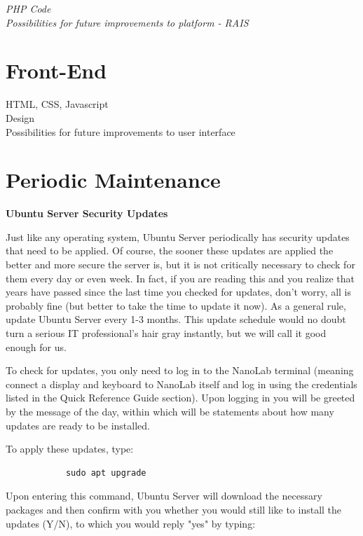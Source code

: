 \documentclass[titlepage]{article}
\begin{document}
    \noindent\textit{PHP Code}
    \\
    
    \noindent\textit{Possibilities for future improvements to platform - RAIS}
    
\section{Front-End}

    HTML, CSS, Javascript 
    \\
    
    \noindent Design
    \\
    
    \noindent Possibilities for future improvements to user interface

\section{Periodic Maintenance}

    \textbf{Ubuntu Server Security Updates}
    
        Just like any operating system, Ubuntu Server periodically has security updates that need to be applied. Of course, the sooner these updates are applied the better and more secure the server is, but it is not critically necessary to check for them every day or even week. In fact, if you are reading this and you realize that years have passed since the last time you checked for updates, don't worry, all is probably fine (but better to take the time to update it now). As a general rule, update Ubuntu Server every 1-3 months. This update schedule would no doubt turn a serious IT professional's hair gray instantly, but we will call it good enough for us.
        
        To check for updates, you only need to log in to the NanoLab terminal (meaning connect a display and keyboard to NanoLab itself and log in using the credentials listed in the Quick Reference Guide section). Upon logging in you will be greeted by the message of the day, within which will be statements about how many updates are ready to be installed.
        
        To apply these updates, type:
        
        \begin{verbatim}
            sudo apt upgrade
        \end{verbatim}
        
        Upon entering this command, Ubuntu Server will download the necessary packages and then confirm with you whether you would still like to install the updates (Y/N), to which you would reply "yes" by typing:
        
\end{document}
